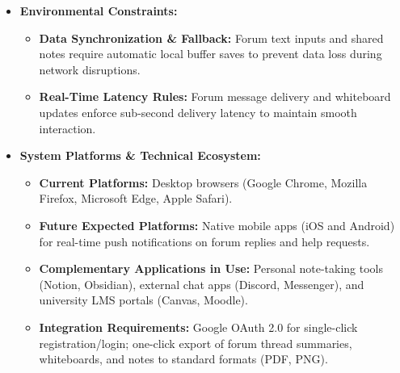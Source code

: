 \documentclass[12pt]{article}
\begin{document}
\begin{itemize}
\begin{itemize}
\par
\item \textbf{Medium Cycle (25–50 minutes):} Joining a live study room attached to a forum thread for study sessions using synchronized timers and shared whiteboards.
\par
\item \textbf{Long Cycle (1–3 hours):} In-depth collaborative problem solving, multi-topic forum discussions, and group study meetings.
\par
\end{itemize}
\item \textbf{Environmental Constraints:}
\par
\begin{itemize}
\item \textbf{Data Synchronization \& Fallback:} Forum text inputs and shared notes require automatic local buffer saves to prevent data loss during network disruptions.
\par
\item \textbf{Real-Time Latency Rules:} Forum message delivery and whiteboard updates enforce sub-second delivery latency to maintain smooth interaction.
\par
\end{itemize}
\item \textbf{System Platforms \& Technical Ecosystem:}
\par
\begin{itemize}
\item \textbf{Current Platforms:} Desktop browsers (Google Chrome, Mozilla Firefox, Microsoft Edge, Apple Safari).
\par
\item \textbf{Future Expected Platforms:} Native mobile apps (iOS and Android) for real-time push notifications on forum replies and help requests.
\par
\item \textbf{Complementary Applications in Use:} Personal note-taking tools (Notion, Obsidian), external chat apps (Discord, Messenger), and university LMS portals (Canvas, Moodle).
\par
\item \textbf{Integration Requirements:} Google OAuth 2.0 for single-click registration/\allowbreak{}login; one-click export of forum thread summaries, whiteboards, and notes to standard formats (PDF, PNG).
\par
\end{itemize}
\end{itemize}
\hypertarget{sec:34-summary-of-key-stakeholder-or-user-needs}{}
\end{document}
